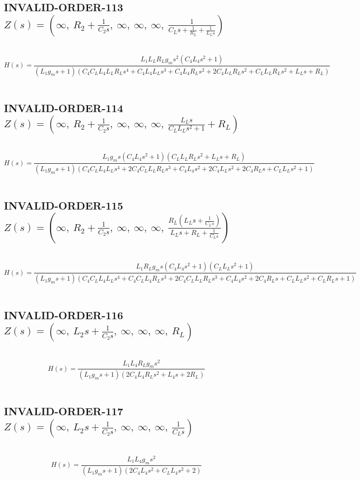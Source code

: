 \documentclass{article}
\begin{document}
\subsection{INVALID-ORDER-113 $Z(s) = \left( \infty, \  R_{2} + \frac{1}{C_{2} s}, \  \infty, \  \infty, \  \infty, \  \frac{1}{C_{L} s + \frac{1}{R_{L}} + \frac{1}{L_{L} s}}\right)$ } \ 
\textbf{\[H(s) = \frac{L_{1} L_{L} R_{L} g_{m} s^{2} \left(C_{4} L_{4} s^{2} + 1\right)}{\left(L_{1} g_{m} s + 1\right) \left(C_{4} C_{L} L_{4} L_{L} R_{L} s^{4} + C_{4} L_{4} L_{L} s^{3} + C_{4} L_{4} R_{L} s^{2} + 2 C_{4} L_{L} R_{L} s^{2} + C_{L} L_{L} R_{L} s^{2} + L_{L} s + R_{L}\right)}\] } \ 
\subsection{INVALID-ORDER-114 $Z(s) = \left( \infty, \  R_{2} + \frac{1}{C_{2} s}, \  \infty, \  \infty, \  \infty, \  \frac{L_{L} s}{C_{L} L_{L} s^{2} + 1} + R_{L}\right)$ } \ 
\textbf{\[H(s) = \frac{L_{1} g_{m} s \left(C_{4} L_{4} s^{2} + 1\right) \left(C_{L} L_{L} R_{L} s^{2} + L_{L} s + R_{L}\right)}{\left(L_{1} g_{m} s + 1\right) \left(C_{4} C_{L} L_{4} L_{L} s^{4} + 2 C_{4} C_{L} L_{L} R_{L} s^{3} + C_{4} L_{4} s^{2} + 2 C_{4} L_{L} s^{2} + 2 C_{4} R_{L} s + C_{L} L_{L} s^{2} + 1\right)}\] } \ 
\subsection{INVALID-ORDER-115 $Z(s) = \left( \infty, \  R_{2} + \frac{1}{C_{2} s}, \  \infty, \  \infty, \  \infty, \  \frac{R_{L} \left(L_{L} s + \frac{1}{C_{L} s}\right)}{L_{L} s + R_{L} + \frac{1}{C_{L} s}}\right)$ } \ 
\textbf{\[H(s) = \frac{L_{1} R_{L} g_{m} s \left(C_{4} L_{4} s^{2} + 1\right) \left(C_{L} L_{L} s^{2} + 1\right)}{\left(L_{1} g_{m} s + 1\right) \left(C_{4} C_{L} L_{4} L_{L} s^{4} + C_{4} C_{L} L_{4} R_{L} s^{3} + 2 C_{4} C_{L} L_{L} R_{L} s^{3} + C_{4} L_{4} s^{2} + 2 C_{4} R_{L} s + C_{L} L_{L} s^{2} + C_{L} R_{L} s + 1\right)}\] } \ 
\subsection{INVALID-ORDER-116 $Z(s) = \left( \infty, \  L_{2} s + \frac{1}{C_{2} s}, \  \infty, \  \infty, \  \infty, \  R_{L}\right)$ } \ 
\textbf{\[H(s) = \frac{L_{1} L_{4} R_{L} g_{m} s^{2}}{\left(L_{1} g_{m} s + 1\right) \left(2 C_{4} L_{4} R_{L} s^{2} + L_{4} s + 2 R_{L}\right)}\] } \ 
\subsection{INVALID-ORDER-117 $Z(s) = \left( \infty, \  L_{2} s + \frac{1}{C_{2} s}, \  \infty, \  \infty, \  \infty, \  \frac{1}{C_{L} s}\right)$ } \ 
\textbf{\[H(s) = \frac{L_{1} L_{4} g_{m} s^{2}}{\left(L_{1} g_{m} s + 1\right) \left(2 C_{4} L_{4} s^{2} + C_{L} L_{4} s^{2} + 2\right)}\] } \ 
\end{document}
